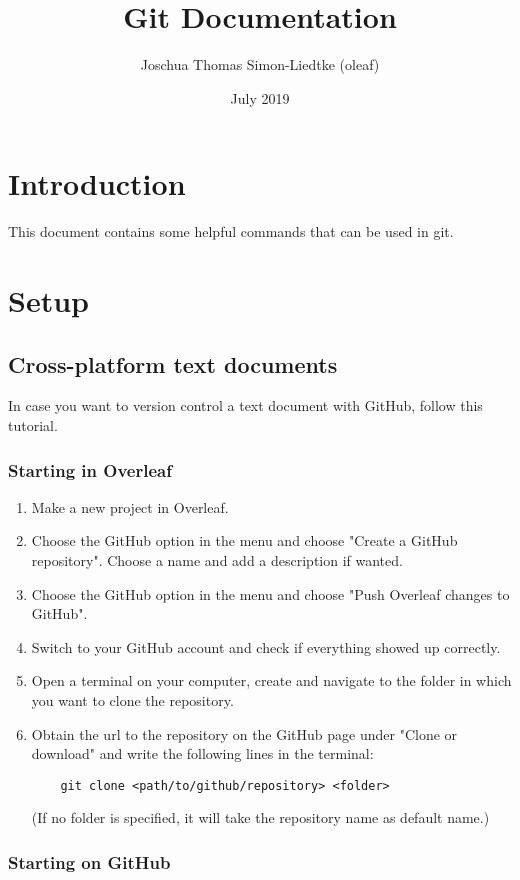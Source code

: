 \documentclass{article}
\title{Git Documentation}
\author{Joschua Thomas Simon-Liedtke (oleaf)}
\date{July 2019}
\begin{document}
\maketitle

\section{Introduction}
This document contains some helpful commands that can be used in git.

\section{Setup}

\subsection{Cross-platform text documents}
In case you want to version control a text document with GitHub, follow this tutorial.

\subsubsection{Starting in Overleaf}

\begin{enumerate}
    \item Make a new project in Overleaf.
    \item Choose the GitHub option in the menu and choose "Create a GitHub repository". Choose a name and add a description if wanted.
    \item Choose the GitHub option in the menu and choose "Push Overleaf changes to GitHub".
    \item Switch to your GitHub account and check if everything showed up correctly.
    \item Open a terminal on your computer, create and navigate to the folder in which you want to clone the repository.
    \item Obtain the url to the repository on the GitHub page under "Clone or download" and write the following lines in the terminal: 
    \begin{verbatim}
    git clone <path/to/github/repository> <folder>
    \end{verbatim}
    (If no folder is specified, it will take the repository name as default name.)
\end{enumerate}

\subsubsection{Starting on GitHub}
\end{document}
